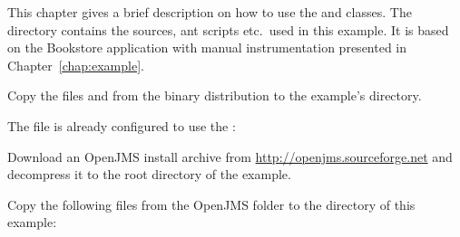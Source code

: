 This chapter gives a brief description on how to use the  and  %
classes. The directory \dir{\JMSBookstoreApplicationDirDistro/} contains the %
sources, ant scripts etc.\ used in this example. It is based on the Bookstore %
application with manual instrumentation presented in Chapter~\ref{chap:example}. %


\begin{compactenum}
\item Copy the files \file{\mainJar} and \file{\commonsLoggingJar} from the %
binary distribution to the example's  directory.
\item The file  %
is already configured to use the :
\end{compactenum}

\enlargethispage{1cm}

\setPropertiesListing


\begin{compactenum}\setcounter{enumi}{2}
\item Download an OpenJMS install archive from \url{http://openjms.sourceforge.net} %
and decompress it to the root directory of the example. 
\item Copy the following files from the OpenJMS  folder to the  directory 
   of this example:
\begin{compactenum}
\item {}
\item {}
\item {}
\item {}
\item {}
\item {}
\end{compactenum}
\end{compactenum}

\enlargethispage{2cm}

